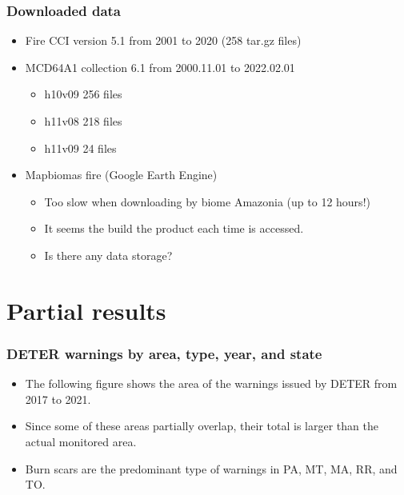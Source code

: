 \documentclass{beamer}
\begin{document}
\begin{frame}
    \frametitle{Downloaded data}
    \begin{itemize}
        \item Fire CCI version 5.1 from 2001 to 2020 (258 tar.gz files)
        \item MCD64A1 collection 6.1 from 2000.11.01 to 2022.02.01 
            \begin{itemize}
                \item h10v09 256 files
                \item h11v08 218 files 
                \item h11v09  24 files
            \end{itemize}
        \item Mapbiomas fire (Google Earth Engine)
            \begin{itemize}
                \item Too slow when downloading by biome Amazonia (up to 12 
                    hours!)
                \item It seems the build the product each time is accessed.
                \item Is there any data storage? 
            \end{itemize}
    \end{itemize}
\end{frame}


\section{Partial results}


\begin{frame}
    \frametitle{DETER warnings by area, type, year, and state}
    \begin{itemize}
        \item The following figure shows the area of the warnings issued by 
            DETER from 2017 to 2021.
        \item Since some of these areas partially overlap, their total is
            larger than the actual monitored area.
        \item Burn scars are the predominant type of warnings in PA, MT, MA,
            RR, and TO.
    \end{itemize}
\end{frame}
\end{document}
